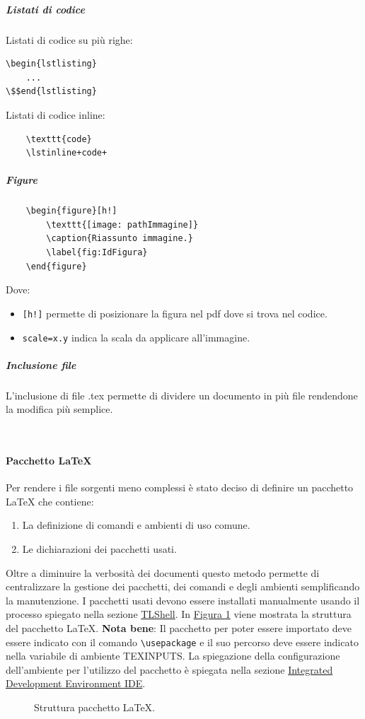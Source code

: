\subparagraph{Listati di codice}
Listati di codice su più righe:
\begin{lstlisting}[mathescape=true]
\begin{lstlisting}
    ...
\$$end{lstlisting}
\end{lstlisting}
\noindent 
Listati di codice inline:
\begin{lstlisting}
    \texttt{code}
    \lstinline+code+
\end{lstlisting}

\subparagraph{Figure}
\begin{lstlisting}
    \begin{figure}[h!]
        \texttt{[image: pathImmagine]}
        \caption{Riassunto immagine.}
        \label{fig:IdFigura}
    \end{figure}
\end{lstlisting}
Dove:
\begin{itemize}
    \item \texttt{[h!]} permette di posizionare la figura nel pdf dove si trova nel codice.
    \item \texttt{scale=x.y} indica la scala da applicare all'immagine.
\end{itemize}

\subparagraph{Inclusione file}
L'inclusione di file .tex permette di dividere un documento in più file rendendone la modifica più semplice.
\begin{lstlisting}
    
\end{lstlisting} 

\paragraph{Pacchetto LaTeX}
Per rendere i file sorgenti meno complessi è stato deciso di definire un pacchetto LaTeX che contiene:
\begin{enumerate}
    \item La definizione di comandi e ambienti di uso comune.
    \item Le dichiarazioni dei pacchetti usati.
\end{enumerate}
Oltre a diminuire la verbosità dei documenti questo metodo permette di centralizzare la gestione dei pacchetti, dei comandi e degli ambienti semplificando la manutenzione.
I pacchetti usati devono essere installati manualmente usando il processo spiegato nella sezione \hyperref[subpar:TLShell]{TLShell}.
In \hyperref[fig:pacchetto_latex]{Figura \ref{fig:pacchetto_latex}} viene mostrata la struttura del pacchetto LaTeX.
\textbf{Nota bene}: Il pacchetto per poter essere importato deve essere indicato con il comando \lstinline|\usepackage| e il suo percorso deve essere indicato nella variabile di ambiente TEXINPUTS.
La spiegazione della configurazione dell'ambiente per l'utilizzo del pacchetto è spiegata nella sezione \hyperref[par:IDE]{Integrated Development Environment IDE}.
\begin{figure}[!h]
    \caption{Struttura pacchetto LaTeX.}
    \label{fig:pacchetto_latex}
\end{figure}

